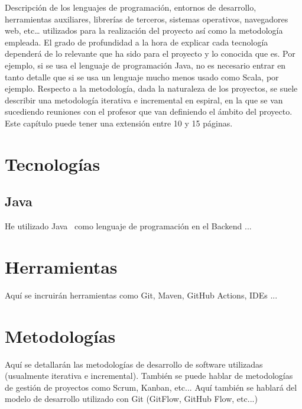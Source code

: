 Descripción de los lenguajes de programación, entornos de desarrollo, herramientas auxiliares, librerías de terceros, sistemas operativos, navegadores web, etc… utilizados para la realización del proyecto así como la metodología empleada. 
El grado de profundidad a la hora de explicar cada tecnología dependerá de lo relevante que ha sido para el proyecto y lo conocida que es. 
Por ejemplo, si se usa el lenguaje de programación Java, no es necesario entrar en tanto detalle que si se usa un lenguaje mucho menos usado como Scala, por ejemplo. Respecto a la metodología, dada la naturaleza de los proyectos, se suele describir una metodología iterativa e incremental en espiral, en la que se van sucediendo reuniones con el profesor que van definiendo el ámbito del proyecto. Este capítulo puede tener una extensión entre 10 y 15 páginas.

\section{Tecnologías}

\subsection{Java}

He utilizado Java~\cite{java} como lenguaje de programación en el Backend ...

\section{Herramientas}

Aquí se incruirán herramientas como Git, Maven, GitHub Actions, IDEs ...

\section{Metodologías}

Aquí se detallarán las metodologías de desarrollo de software utilizadas (usualmente iterativa e incremental). 
También se puede hablar de metodologías de gestión de proyectos como Scrum, Kanban, etc... 
Aquí también se hablará del modelo de desarrollo utilizado con Git (GitFlow, GitHub Flow, etc...)
